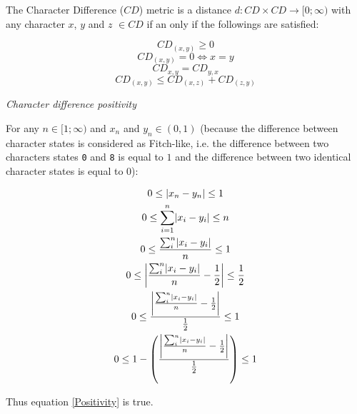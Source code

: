 \documentclass[12pt,letterpaper]{article}
\DeclarePairedDelimiter\abs{\lvert}{\rvert}%
\renewcommand{\subsection}[1]{%
\bigskip
\begin{center}
\begin{large}
\normalfont\itshape #1
\end{large}
\end{center}}
\begin{document}
The Character Difference ($CD$) metric is a distance $d: CD \times CD \rightarrow [0;\infty)$ with any character $x$, $y$ and $z$ $\in CD$ if an only if the followings are satisfied:

\begin{equation}
    \label{Positivity}
    CD_{(x,y)} \geq 0
\end{equation}
\begin{equation}
    \label{Identity}
    CD_{(x,y)} = 0 \Leftrightarrow x = y
\end{equation}
\begin{equation}
    \label{Equality}
    CD_{x,y} = CD_{y,x}
\end{equation}
\begin{equation}
    \label{Subadditivity}
    CD_{(x,y)} \leq CD_{(x,z)} + CD_{(z,y)}
\end{equation}


\subsection{Character difference positivity}

For any $n \in [1;\infty)$ and $x_{n}$ and $y_{n} \in (0,1)$ (because the difference between character states is considered as Fitch-like, i.e. the difference between two characters states \texttt{0} and \texttt{8} is equal to $1$ and the difference between two identical character states is equal to $0$):

\begin{equation}
    \label{positive_demo}
    \begin{gathered}
    0 \leq  \abs{x_{n}-y_{n}} \leq 1\\
    0 \leq  \sum_{i=1}^{n}\abs{x_{i}-y_{i}} \leq n\\
    0 \leq  \frac{\sum_{i}^{n}\abs{x_{i}-y_{i}}}{n} \leq 1\\
    0 \leq  \abs*{\frac{\sum_{i}^{n}\abs{x_{i}-y_{i}}}{n}-\frac{1}{2}} \leq \frac{1}{2}\\
    0 \leq  \frac{\abs*{\frac{\sum_{i}^{n}\abs{x_{i}-y_{i}}}{n}-\frac{1}{2}}}{\frac{1}{2}} \leq 1\\
    0 \leq  1 - \left(\frac{\abs*{\frac{\sum_{i}^{n}\abs{x_{i}-y_{i}}}{n}-\frac{1}{2}}}{\frac{1}{2}}\right) \leq 1\\
    \end{gathered}
\end{equation}

Thus equation \ref{Positivity} is true.
\end{document}

